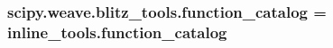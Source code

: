 \subsubsection[{function\+\_\+catalog}]{\setlength{\rightskip}{0pt plus 5cm}scipy.\+weave.\+blitz\+\_\+tools.\+function\+\_\+catalog = inline\+\_\+tools.\+function\+\_\+catalog}\label{namespacescipy_1_1weave_1_1blitz__tools_a62d30ed80a44ead3ae844022b583ce12}
